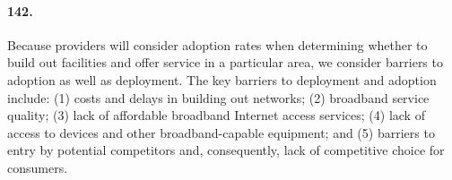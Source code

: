 \paragraph{142. } Because providers will consider adoption rates when determining whether to build out facilities and offer service in a particular area, we consider barriers to adoption as well as deployment. The key barriers to deployment and adoption include: (1) costs and delays in building out networks; (2) broadband service quality; (3) lack of affordable broadband Internet access services; (4) lack of access to devices and other broadband-capable equipment; and (5) barriers to entry by potential competitors and, consequently, lack of competitive choice for consumers.
